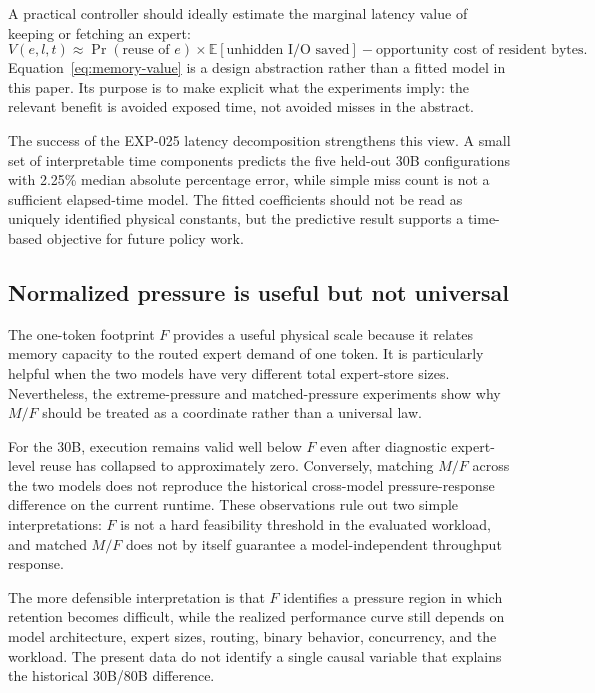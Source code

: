A practical controller should ideally estimate the marginal latency value of keeping or fetching an expert:
\begin{equation}
    V(e,l,t)
    \approx
    \Pr(\text{reuse of } e)
    \times
    \mathbb{E}[\text{unhidden I/O saved}]
    -
    \text{opportunity cost of resident bytes}.
    \label{eq:memory-value}
\end{equation}
Equation~\eqref{eq:memory-value} is a design abstraction rather than a fitted model in this paper. Its purpose is to make explicit what the experiments imply: the relevant benefit is avoided exposed time, not avoided misses in the abstract.

The success of the EXP-025 latency decomposition strengthens this view. A small set of interpretable time components predicts the five held-out 30B configurations with 2.25\% median absolute percentage error, while simple miss count is not a sufficient elapsed-time model. The fitted coefficients should not be read as uniquely identified physical constants, but the predictive result supports a time-based objective for future policy work.

\subsection{Normalized pressure is useful but not universal}

The one-token footprint $F$ provides a useful physical scale because it relates memory capacity to the routed expert demand of one token. It is particularly helpful when the two models have very different total expert-store sizes. Nevertheless, the extreme-pressure and matched-pressure experiments show why $M/F$ should be treated as a coordinate rather than a universal law.

For the 30B, execution remains valid well below $F$ even after diagnostic expert-level reuse has collapsed to approximately zero. Conversely, matching $M/F$ across the two models does not reproduce the historical cross-model pressure-response difference on the current runtime. These observations rule out two simple interpretations: $F$ is not a hard feasibility threshold in the evaluated workload, and matched $M/F$ does not by itself guarantee a model-independent throughput response.

The more defensible interpretation is that $F$ identifies a pressure region in which retention becomes difficult, while the realized performance curve still depends on model architecture, expert sizes, routing, binary behavior, concurrency, and the workload. The present data do not identify a single causal variable that explains the historical 30B/80B difference.


